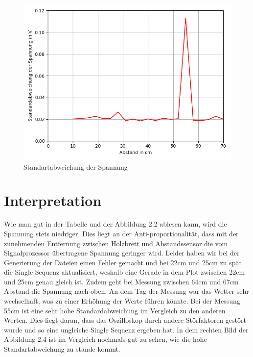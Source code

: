\documentclass[12pt, oneside, a4paper, \docLanguage]{report}
\begin{document}
\begin{figure}[H]
	\centering\small
	\includegraphics[width=\textwidth]{media/myplot2.png}
	\caption{Standartabweichung der Spannung}
	\label{fig:VERSUCH_1_PLOT_STANDARTABWEICHUNG}
\end{figure}

\newpage
\section{Interpretation}
\label{chap:VERSUCH_1_INTERPRETATION}
Wie man gut in der Tabelle und der Abbildung 2.2 ablesen kann, wird die Spannung stets niedriger. Dies liegt an der Anti-proportionalität, dass mit der zunehmenden Entfernung zwischen Holzbrett und Abstandssensor die vom Signalprozessor übertragene Spannung geringer wird. 
\newline
Leider haben wir bei der Generierung der Dateien einen Fehler gemacht und bei 22cm und 25cm zu spät die Single Sequenz aktualisiert, weshalb eine Gerade in dem Plot zwischen 22cm und 25cm genau gleich ist.
Zudem geht bei Messung zwischen 64cm und 67cm Abstand die Spannung nach oben. An dem Tag der Messung war das Wetter sehr wechselhaft, was zu einer Erhöhung der Werte führen könnte.
\newline
\newline
Bei der Messung 55cm ist eine sehr hohe Standardabweichung im Vergleich zu den anderen Werten. Dies liegt daran, dass das Oszilloskop durch andere Störfaktoren gestört wurde und so eine ungleiche Single Sequenz ergeben hat.
In dem rechten Bild der Abbildung 2.4 ist im Vergleich nochmals gut zu sehen, wie die hohe Standartabweichung zu stande kommt.
\end{document}
